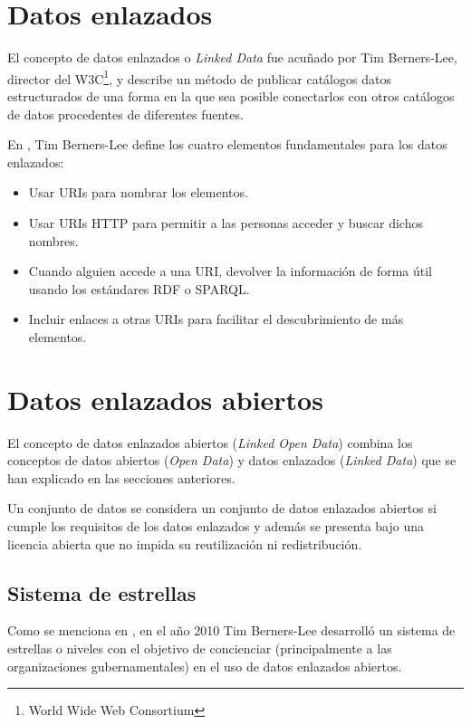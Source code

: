 \section{Datos enlazados}
El concepto de datos enlazados o \textit{Linked Data} fue acuñado por Tim Berners-Lee, director del W3C\footnote{World Wide Web Consortium}, y describe un método de publicar catálogos datos estructurados de una forma en la que sea posible conectarlos con otros catálogos de datos procedentes de diferentes fuentes.

En \cite{tbl-linkedopendata}, Tim Berners-Lee define los cuatro elementos fundamentales para los datos enlazados:
\begin{itemize}
\item Usar URIs para nombrar los elementos.
\item Usar URIs HTTP para permitir a las personas acceder y buscar dichos nombres.
\item Cuando alguien accede a una URI, devolver la información de forma útil usando los estándares RDF o SPARQL.
\item Incluir enlaces a otras URIs para facilitar el descubrimiento de más elementos.
\end{itemize}



\section{Datos enlazados abiertos}
El concepto de datos enlazados abiertos (\textit{Linked Open Data}) combina los conceptos de datos abiertos (\textit{Open Data}) y datos enlazados (\textit{Linked Data}) que se han explicado en las secciones anteriores.

Un conjunto de datos se considera un conjunto de datos enlazados abiertos si cumple los requisitos de los datos enlazados y además se presenta bajo una licencia abierta que no impida su reutilización ni redistribución.


\subsection{Sistema de estrellas}
Como se menciona en \cite{tbl-linkedopendata}, en el año 2010 Tim Berners-Lee desarrolló un sistema de estrellas o niveles con el objetivo de concienciar (principalmente a las organizaciones gubernamentales) en el uso de datos enlazados abiertos.

